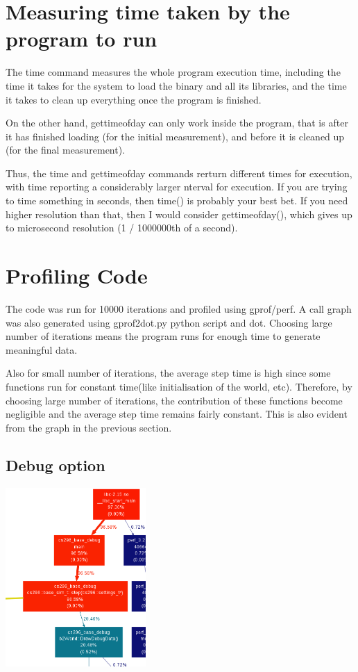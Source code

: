 \documentclass[a4paper,11pt]{article}
\begin{document}
\section{Measuring time taken by the program to run}

The time command measures the whole program execution time, including the time it takes for the system to load the binary and all its libraries, and the time it takes to clean up everything once the program is finished.

On the other hand, gettimeofday can only work inside the program, that is after it has finished loading (for the initial measurement), and before it is cleaned up (for the final measurement).

Thus, the time and gettimeofday commands rerturn different times for execution, with time reporting a considerably larger nterval for execution.
If you are trying to time something in seconds, then time() is probably your best bet. If you need higher resolution than that, then I would consider gettimeofday(), which gives up to microsecond resolution (1 / 1000000th of a second).

\section{Profiling Code}

The code was run for 10000 iterations and profiled using gprof/perf. A call graph was also generated using gprof2dot.py python script and dot. Choosing large number of iterations means the program runs for enough time to generate meaningful data.

Also for small number of iterations, the average step time is high since some functions run for constant time(like initialisation of the world, etc). Therefore, by choosing large number of iterations, the contribution of these functions become negligible and the average step time remains fairly constant. This is also evident from the graph in the previous section.\\

\subsection{Debug option}
\begin{center}
\includegraphics[width=0.4\textwidth]{images/debug1.eps}
\end{center}
\end{document}
